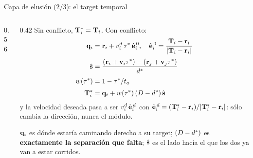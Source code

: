 \documentclass[aspectratio=169,11pt]{beamer}
\begin{document}
\begin{frame}{Capa de elusión (2/3): el target temporal}
    \vspace{-0.2em}
    \begin{columns}[c,onlytextwidth]
        \begin{column}{0.56\textwidth}
            \centering
            \resizebox{\linewidth}{!}{}
        \end{column}\hfill
        \begin{column}{0.42\textwidth}
            \footnotesize
            \setlength{\abovedisplayskip}{4pt}\setlength{\belowdisplayskip}{4pt}
            Sin conflicto, $\mathbf{T}_i^{*} = \mathbf{T}_i$. Con conflicto:
            \[\begin{aligned}
                \mathbf{q}_i &= \mathbf{r}_i + v_i^{d}\,\tau^{*}\,\hat{\mathbf{e}}_i^{\,0},
                \quad \hat{\mathbf{e}}_i^{\,0} = \frac{\mathbf{T}_i - \mathbf{r}_i}{|\mathbf{T}_i - \mathbf{r}_i|}\\[0.25em]
                \hat{\mathbf{s}} &= \frac{(\mathbf{r}_i + \mathbf{v}_i\tau^{*}) - (\mathbf{r}_j + \mathbf{v}_j\tau^{*})}{d^{*}}\\[0.25em]
                w(\tau^{*}) &= 1 - \tau^{*}/t_a\\[0.25em]
                \mathbf{T}_i^{*} &= \mathbf{q}_i + w(\tau^{*})\,(D - d^{*})\,\hat{\mathbf{s}}
            \end{aligned}\]
            y la velocidad deseada pasa a ser
            $v_i^{d}\,\hat{\mathbf{e}}_i^{\,d}$ con
            $\hat{\mathbf{e}}_i^{\,d} = (\mathbf{T}_i^{*} - \mathbf{r}_i)/|\mathbf{T}_i^{*} - \mathbf{r}_i|$:
            \alert{sólo cambia la dirección}, nunca el módulo.
            \vspace{0.35em}

            $\mathbf{q}_i$ es dónde estaría caminando derecho a su target;
            $(D - d^{*})$ es \textbf{exactamente la separación que falta};
            $\hat{\mathbf{s}}$ es el lado hacia el que los dos ya van a estar corridos.
        \end{column}
    \end{columns}
\end{frame}
\end{document}
